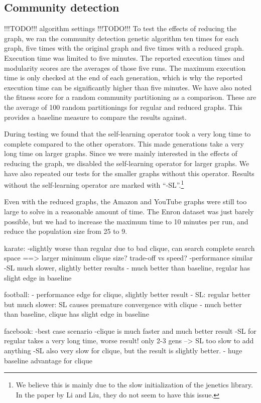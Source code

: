 \subsection{Community detection}
!!!TODO!!! algorithm settings !!!TODO!!!
To test the effects of reducing the graph, we ran the community detection genetic algorithm ten times for each graph, five times with the original graph and five times with a reduced graph. Execution time was limited to five minutes. The reported execution times and modularity scores are the averages of those five runs. The maximum execution time is only checked at the end of each generation, which is why the reported execution time can be significantly higher than five minutes. We have also noted the fitness score for a random community partitioning as a comparison. These are the average of 100 random partitionings for regular and reduced graphs. This provides a baseline measure to compare the results against.
\par
During testing we found that the self-learning operator took a very long time to complete compared to the other operators. This made generations take a very long time on larger graphs. Since we were mainly interested in the effects of reducing the graph, we disabled the self-learning operator for larger graphs. We have also repeated our tests for the smaller graphs without this operator. Results without the self-learning operator are marked with ``-SL''.\footnote{We believe this is mainly due to the slow initialization of the jenetics library. In the paper by Li and Liu, they do not seem to have this issue. }
\par
Even with the reduced graphs, the Amazon and YouTube graphs were still too large to solve in a reasonable amount of time. The Enron dataset was just barely possible, but we had to increase the maximum time to 10 minutes per run, and reduce the population size from 25 to 9.




karate: 
-slightly worse than regular due to bad clique, can search complete search space ==> larger minimum clique size? trade-off vs speed?
-performance similar
-SL much slower, slightly better results
- much better than baseline, regular has slight edge in baseline

football:
- performance edge for clique, slightly better result
- SL: regular better but much slower: SL causes premature convergence with clique
- much better than baseline, clique has slight edge in baseline

facebook:
-best case scenario
-clique is much faster and much better result
-SL for regular takes a very long time, worse result! only 2-3 gens --> SL too slow to add anything
-SL also very slow for clique, but the result is slightly better.
- huge baseline advantage for clique


